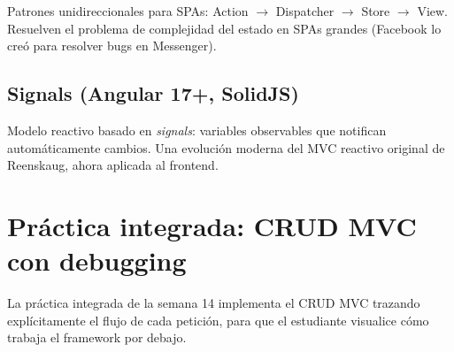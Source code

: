 Patrones unidireccionales para SPAs: Action $\to$ Dispatcher $\to$
Store $\to$ View. Resuelven el problema de complejidad del estado en
SPAs grandes (Facebook lo creó para resolver bugs en Messenger).

\subsection{Signals (Angular 17+, SolidJS)}

Modelo reactivo basado en \emph{signals}: variables observables que
notifican automáticamente cambios. Una evolución moderna del MVC
reactivo original de Reenskaug, ahora aplicada al frontend.

\section{Práctica integrada: CRUD MVC con debugging}

La práctica integrada de la semana 14 implementa el CRUD MVC
trazando explícitamente el flujo de cada petición, para que el
estudiante visualice cómo trabaja el framework por debajo.


